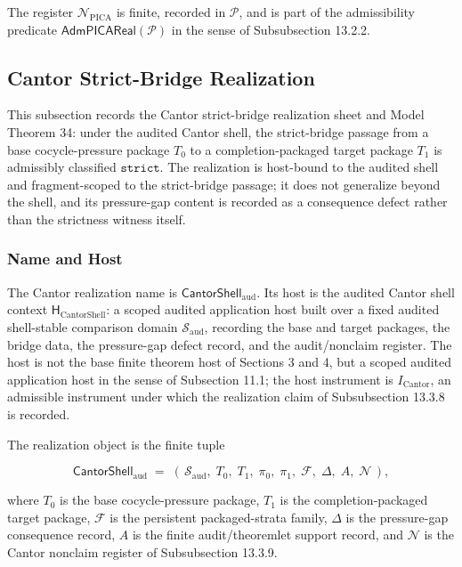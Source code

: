 \documentclass[11pt]{article}
\theoremstyle{definition}
\begin{document}
The register \(\mathcal N_{\mathrm{PICA}}\) is finite, recorded in \(\mathcal P\), and is part of the admissibility predicate \(\mathsf{AdmPICAReal}(\mathcal P)\) in the sense of Subsubsection 13.2.2.

\subsection{Cantor Strict-Bridge Realization}

This subsection records the Cantor strict-bridge realization sheet and Model Theorem 34: under the audited Cantor shell, the strict-bridge passage from a base cocycle-pressure package \(T_0\) to a completion-packaged target package \(T_1\) is admissibly classified \(\texttt{strict}\). The realization is host-bound to the audited shell and fragment-scoped to the strict-bridge passage; it does not generalize beyond the shell, and its pressure-gap content is recorded as a consequence defect rather than the strictness witness itself.

\subsubsection{Name and Host}

The Cantor realization name is \(\mathsf{CantorShell}_{\mathrm{aud}}\). Its host is the audited Cantor shell context \(\mathsf H_{\mathrm{CantorShell}}\): a scoped audited application host built over a fixed audited shell-stable comparison domain \(\mathcal S_{\mathrm{aud}}\), recording the base and target packages, the bridge data, the pressure-gap defect record, and the audit/nonclaim register. The host is not the base finite theorem host of Sections 3 and 4, but a scoped audited application host in the sense of Subsection 11.1; the host instrument is \(I_{\mathrm{Cantor}}\), an admissible instrument under which the realization claim of Subsubsection 13.3.8 is recorded.

The realization object is the finite tuple

\[
\mathsf{CantorShell}_{\mathrm{aud}}
\;=\;
(\,\mathcal S_{\mathrm{aud}},\;T_0,\;T_1,\;\pi_0,\;\pi_1,\;\mathcal F,\;\Delta,\;A,\;\mathcal N\,),
\]

where \(T_0\) is the base cocycle-pressure package, \(T_1\) is the completion-packaged target package, \(\mathcal F\) is the persistent packaged-strata family, \(\Delta\) is the pressure-gap consequence record, \(A\) is the finite audit/theoremlet support record, and \(\mathcal N\) is the Cantor nonclaim register of Subsubsection 13.3.9.
\end{document}
